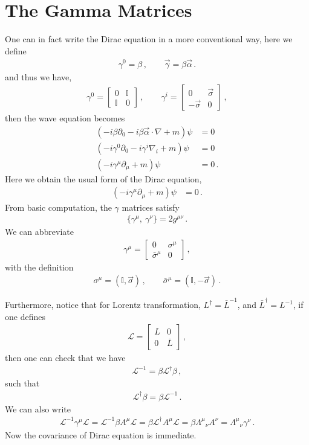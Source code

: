 \documentclass[11pt, onesided]{book}
\theoremstyle{break}
\theoremstyle{break}
\newcommand{\pd}{\partial}
\newcommand{\bmat}[1]{\begin{bmatrix} #1 \end{bmatrix}}
\begin{document}
\section[The Gamma Operators]{\color{red}The Gamma Matrices\color{black}}
One can in fact write the Dirac equation in a more conventional way, here we define
\begin{align*}
\gamma^0 = \beta\,,\qquad
\vec{\gamma} = \beta \vec{\alpha}\,.
\end{align*}
and thus we have,
\begin{align*}
\gamma^0 = \bmat{0 & \mathbb{I} \\ \mathbb{I} &0}\,,\qquad
\gamma^i = \bmat{0 & \vec{\sigma} \\ -\vec{\sigma} & 0}\,,
\end{align*}
then the wave equation becomes
\begin{align*}
(-i\beta \pd_0 - i\beta \vec{\alpha}\cdot \nabla + m) \psi &= 0\\
(-i \gamma^0 \pd_0 - i\gamma^i \nabla_i + m)\psi &= 0\\
(-i \gamma^\mu \pd_\mu + m)\psi &=0\,.
\end{align*}
Here we obtain the usual form of the Dirac equation,
\begin{align}
(-i \gamma^\mu \pd_\mu + m)\psi &=0\,.
\end{align}
From basic computation, the $\gamma$ matrices satisfy
\begin{align*}
\{\gamma^\mu,\ \gamma^\nu\} = 2g^{\mu\nu}\,.
\end{align*}
We can abbreviate
\begin{align*}
\gamma^\mu = \bmat{0 & \sigma^\mu \\ \bar{\sigma}^\mu & 0}\,,
\end{align*}
with the definition
\begin{align*}
\sigma^\mu = (\mathbb{I} , \vec{\sigma})\,,\qquad 
\bar{\sigma}^\mu = (\mathbb{I}, -\vec{\sigma})\,.
\end{align*}

Furthermore, notice that for Lorentz transformation, $L^\dagger = \bar{L}^{-1}$, and $\bar{L}^{\dagger} = L^{-1}$, if one defines
\begin{align*}
\mathcal{L} = \bmat{L & 0 \\ 0 & \bar{L}}\,,
\end{align*}
then one can check that we have
\begin{align*}
\mathcal{L}^{-1} = \beta \mathcal{L}^{\dagger} \beta \,,
\end{align*}
such that 
\begin{align*}
\mathcal{L}^{\dagger}\beta = \beta \mathcal{L}^{-1}\,.
\end{align*}
We can also write
\begin{align*}
\mathcal{L}^{-1} \gamma^\mu \mathcal{L} = \mathcal{L}^{-1} \beta A^\mu \mathcal{L} = \beta \mathcal{L}^{\dagger} A^\mu \mathcal{L} =\beta \Lambda^\mu{}_\nu A^\nu =\Lambda^{\mu}{}_{\nu} \gamma^\nu\,.
\end{align*}
Now the covariance of Dirac equation is immediate.\\
\end{document}
